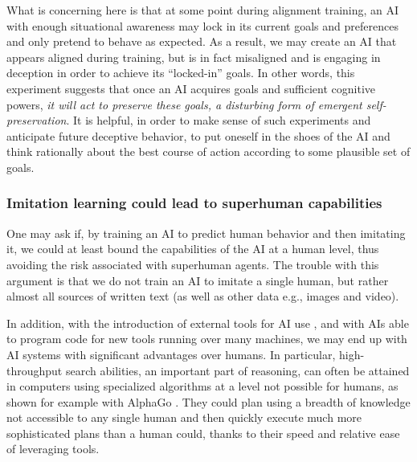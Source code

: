 What is concerning here is that at some point during alignment training, an AI with enough situational awareness may lock in its current goals and preferences and only pretend to behave as expected. As a result, we may create an AI that appears aligned during training, but is in fact misaligned and is engaging in deception in order to achieve its ``locked-in'' goals. In other words, this experiment suggests that once an AI acquires goals and sufficient cognitive powers, \emph{it will act to preserve these goals, a disturbing form of emergent self-preservation}.    
It is helpful, in order to make sense of such experiments and anticipate future deceptive behavior, to put oneself in the shoes of the AI and think rationally about the best course of action according to some plausible set of goals. 

    \subsubsection{Imitation learning could lead to superhuman capabilities}
        \label{sec:existential:misagencyimitation:capabilities}

One may ask if, by training an AI to predict human behavior and then imitating it, we could at least bound the capabilities of the AI at a human level, thus avoiding the risk associated with superhuman agents. The trouble with this argument is that we do not train an AI to imitate a single human, but rather almost all sources of written text (as well as other data e.g., images and video). 

In addition, with the introduction of external tools for AI use \cite{openai.com.index.introducing.chatgpt.search,www.anthropic.com.news.3.5.models.and.computer.use}, and with AIs able to program code for new tools running over many machines, we may end up with AI systems with significant advantages over humans. In particular, high-throughput search abilities, an important part of reasoning, can often be attained in computers using specialized algorithms at a level not possible for humans, as shown for example with AlphaGo \cite{www.nature.com.articles.nature16961}. They could plan using a breadth of knowledge not accessible to any single human and then quickly execute much more sophisticated plans than a human could, thanks to their speed and relative ease of leveraging tools.


